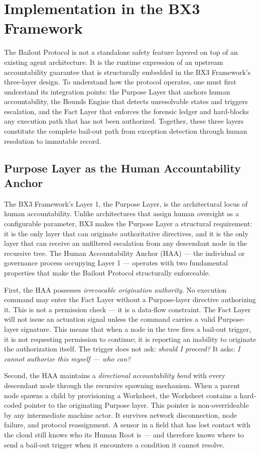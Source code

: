 \section{Implementation in the BX3 Framework}

The Bailout Protocol is not a standalone safety feature layered on top of an existing agent architecture. It is the runtime expression of an upstream accountability guarantee that is structurally embedded in the BX3 Framework's three-layer design. To understand how the protocol operates, one must first understand its integration points: the Purpose Layer that anchors human accountability, the Bounds Engine that detects unresolvable states and triggers escalation, and the Fact Layer that enforces the forensic ledger and hard-blocks any execution path that has not been authorized. Together, these three layers constitute the complete bail-out path from exception detection through human resolution to immutable record.

\subsection{Purpose Layer as the Human Accountability Anchor}

The BX3 Framework's Layer 1, the Purpose Layer, is the architectural locus of human accountability. Unlike architectures that assign human oversight as a configurable parameter, BX3 makes the Purpose Layer a structural requirement: it is the only layer that can originate authoritative directives, and it is the only layer that can receive an unfiltered escalation from any descendant node in the recursive tree. The Human Accountability Anchor (HAA) — the individual or governance process occupying Layer 1 — operates with two fundamental properties that make the Bailout Protocol structurally enforceable.

First, the HAA possesses \textit{irrevocable origination authority}. No execution command may enter the Fact Layer without a Purpose-layer directive authorizing it. This is not a permission check — it is a data-flow constraint. The Fact Layer will not issue an actuation signal unless the command carries a valid Purpose-layer signature. This means that when a node in the tree fires a bail-out trigger, it is not requesting permission to continue; it is reporting an inability to originate the authorization itself. The trigger does not ask: \emph{should I proceed?} It asks: \emph{I cannot authorize this myself — who can?}

Second, the HAA maintains a \textit{directional accountability bond} with every descendant node through the recursive spawning mechanism. When a parent node spawns a child by provisioning a Worksheet, the Worksheet contains a hard-coded pointer to the originating Purpose layer. This pointer is non-overrideable by any intermediate machine actor. It survives network disconnection, node failure, and protocol reassignment. A sensor in a field that has lost contact with the cloud still knows who its Human Root is — and therefore knows where to send a bail-out trigger when it encounters a condition it cannot resolve.


